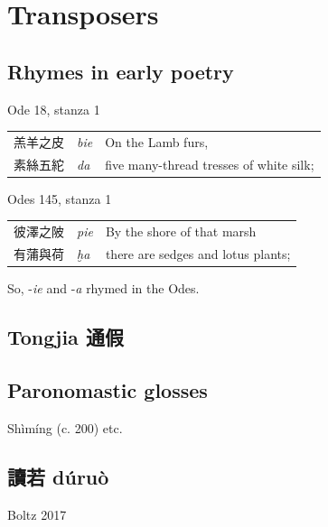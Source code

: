 \part{Transposers}\label{part-2.-Transivitizers}

\chapter{Rhymes in early poetry}


Ode 18, stanza 1

\begin{tabular}{lll}
{\Large 羔羊之皮} & \textit{bie} & On the Lamb furs,   \\
{\Large 素絲五紽} & \textit{da} & five many-thread tresses of white silk;
\end{tabular}

Odes 145, stanza 1 

\begin{tabular}{lll}
{\Large 彼澤之陂} & \textit{pie} & By the shore of that marsh   \\
{\Large 有蒲與荷} & \textit{ḫa} & there are sedges and lotus
plants; 
\end{tabular}

So, -\textit{ie} and -\textit{a} rhymed in the Odes. 




\chapter{Tongjia 通假}

\chapter{Paronomastic glosses}

Shìmíng (c. 200) etc.


\chapter{讀若 dúruò}

Boltz 2017



